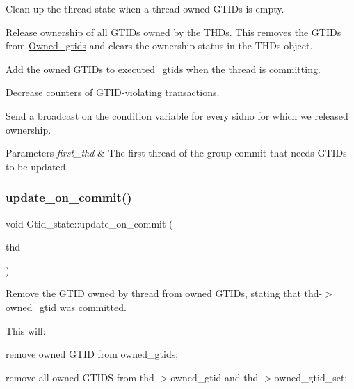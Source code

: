 \begin{DoxyItemize}
\item Clean up the thread state when a thread owned G\+T\+I\+Ds is empty.
\item Release ownership of all G\+T\+I\+Ds owned by the T\+H\+Ds. This removes the G\+T\+I\+Ds from \mbox{\hyperlink{classOwned__gtids}{Owned\+\_\+gtids}} and clears the ownership status in the T\+H\+Ds object.
\item Add the owned G\+T\+I\+Ds to executed\+\_\+gtids when the thread is committing.
\item Decrease counters of G\+T\+ID-\/violating transactions.
\item Send a broadcast on the condition variable for every sidno for which we released ownership.
\end{DoxyItemize}


\begin{DoxyParams}{Parameters}
{\em first\+\_\+thd} & The first thread of the group commit that needs G\+T\+I\+Ds to be updated. \\
\hline
\end{DoxyParams}
\mbox{\label{classGtid__state_adc4c103d1209489a7b7e0d179d654faf}} 
\subsubsection{\texorpdfstring{update\+\_\+on\+\_\+commit()}{update\_on\_commit()}}
{\footnotesize\ttfamily void Gtid\+\_\+state\+::update\+\_\+on\+\_\+commit (\begin{DoxyParamCaption}\item[{T\+HD $\ast$}]{thd }\end{DoxyParamCaption})}

Remove the G\+T\+ID owned by thread from owned G\+T\+I\+Ds, stating that thd-\/$>$owned\+\_\+gtid was committed.

This will\+:
\begin{DoxyItemize}
\item remove owned G\+T\+ID from owned\+\_\+gtids;
\item remove all owned G\+T\+I\+DS from thd-\/$>$owned\+\_\+gtid and thd-\/$>$owned\+\_\+gtid\+\_\+set;
\end{DoxyItemize}


